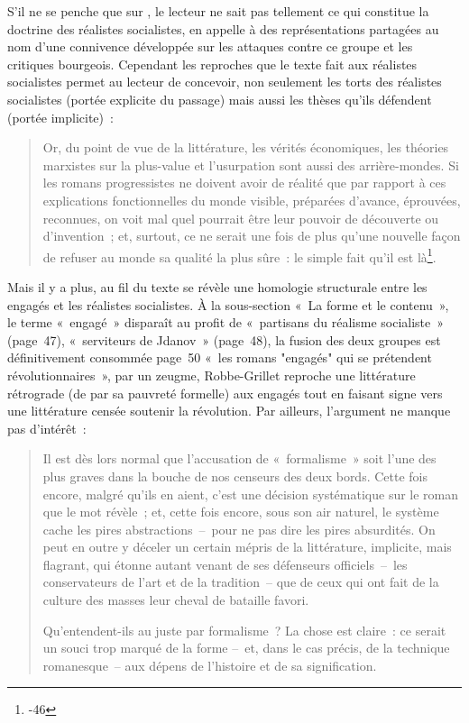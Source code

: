 \documentclass[12pt, a4paper]{article}
\begin{document}
S'il ne se penche que sur \punr{}, le lecteur ne sait pas tellement ce qui constitue la doctrine des réalistes socialistes, \robbe{} en appelle à des représentations partagées au nom d'une connivence développée sur les attaques contre ce groupe et les critiques bourgeois. Cependant les reproches que le texte fait aux réalistes socialistes permet au lecteur de concevoir, non seulement les torts des réalistes socialistes (portée explicite du passage) mais aussi les thèses qu'ils défendent (portée implicite)~:
\begin{quote}
Or, du point de vue de la littérature, les vérités économiques, les théories marxistes sur la plus-value et l’usurpation sont aussi des arrière-mondes. Si les romans progressistes ne doivent avoir de réalité que par rapport à ces explications fonctionnelles du monde visible, préparées d’avance, éprouvées, reconnues, on voit mal quel pourrait être leur pouvoir de découverte ou d’invention~; et, surtout, ce ne serait une fois de plus qu’une nouvelle façon de refuser au monde sa qualité la plus sûre~: le simple fait qu’il est là\footnote{-46}.
\end{quote}
Mais il y a plus, au fil du texte se révèle une homologie structurale entre les engagés et les réalistes socialistes. À la sous-section %
«~La forme et le contenu~», le terme «~engagé~» disparaît au profit de «~partisans du réalisme socialiste~» (page~47), «~serviteurs de Jdanov~» (page~48), la fusion des deux groupes est définitivement consommée page~50 «~les romans "engagés" qui se prétendent révolutionnaires~», par un zeugme, Robbe-Grillet reproche une littérature rétrograde (de par sa pauvreté formelle) aux engagés tout en faisant signe vers une littérature censée soutenir la révolution. Par ailleurs, l'argument ne manque pas d'intérêt~: 
\begin{quote}
    Il est dès lors normal que l’accusation de «~formalisme~» soit l’une des plus graves dans la bouche de nos censeurs des deux bords. Cette fois encore, malgré qu’ils en aient, c’est une décision systématique sur le roman que le mot révèle~; et, cette fois encore, sous son air naturel, le système cache les pires abstractions~–~pour ne pas dire les pires absurdités. On peut en outre y déceler un certain mépris de la littérature, implicite, mais flagrant, qui étonne autant venant de ses défenseurs officiels~–~les conservateurs de l’art et de la tradition~– que de ceux qui ont fait de la culture des masses leur cheval de bataille favori.

    Qu’entendent-ils au juste par formalisme~? La chose est claire~: ce serait un souci trop marqué de la forme –~et, dans le cas précis, de la technique romanesque~– aux dépens de l’histoire et de sa signification.
\end{quote}
\end{document}
